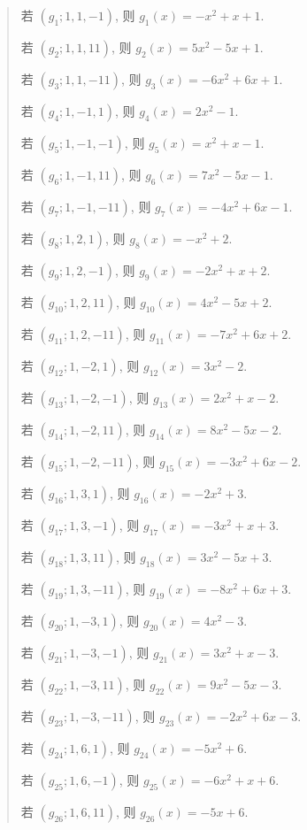 \begin{example}
\begin{quotation}
        若 $(g_1; 1, 1, -1)$, 则 $g_1 (x) = -x^2+x+1$.

        若 $(g_2; 1, 1, 11)$, 则 $g_2 (x) = 5 x^2-5 x+1$.

        若 $(g_3; 1, 1, -11)$, 则 $g_3 (x) = -6 x^2+6 x+1$.

        若 $(g_4; 1, -1, 1)$, 则 $g_4 (x) = 2 x^2-1$.

        若 $(g_5; 1, -1, -1)$, 则 $g_5 (x) = x^2+x-1$.

        若 $(g_6; 1, -1, 11)$, 则 $g_6 (x) = 7 x^2-5 x-1$.

        若 $(g_7; 1, -1, -11)$, 则 $g_7 (x) = -4 x^2+6 x-1$.

        若 $(g_8; 1, 2, 1)$, 则 $g_8 (x) = -x^2+2$.

        若 $(g_9; 1, 2, -1)$, 则 $g_9 (x) = -2 x^2+x+2$.

        若 $(g_{10}; 1, 2, 11)$, 则 $g_{10} (x) = 4 x^2-5 x+2$.

        若 $(g_{11}; 1, 2, -11)$, 则 $g_{11} (x) = -7 x^2+6 x+2$.

        若 $(g_{12}; 1, -2, 1)$, 则 $g_{12} (x) = 3 x^2-2$.

        若 $(g_{13}; 1, -2, -1)$, 则 $g_{13} (x) = 2 x^2+x-2$.

        若 $(g_{14}; 1, -2, 11)$, 则 $g_{14} (x) = 8 x^2-5 x-2$.

        若 $(g_{15}; 1, -2, -11)$, 则 $g_{15} (x) = -3 x^2+6 x-2$.

        若 $(g_{16}; 1, 3, 1)$, 则 $g_{16} (x) = -2 x^2+3$.

        若 $(g_{17}; 1, 3, -1)$, 则 $g_{17} (x) = -3 x^2+x+3$.

        若 $(g_{18}; 1, 3, 11)$, 则 $g_{18} (x) = 3 x^2-5 x+3$.

        若 $(g_{19}; 1, 3, -11)$, 则 $g_{19} (x) = -8 x^2+6 x+3$.

        若 $(g_{20}; 1, -3, 1)$, 则 $g_{20} (x) = 4 x^2-3$.

        若 $(g_{21}; 1, -3, -1)$, 则 $g_{21} (x) = 3 x^2+x-3$.

        若 $(g_{22}; 1, -3, 11)$, 则 $g_{22} (x) = 9 x^2-5 x-3$.

        若 $(g_{23}; 1, -3, -11)$, 则 $g_{23} (x) = -2 x^2+6 x-3$.

        若 $(g_{24}; 1, 6, 1)$, 则 $g_{24} (x) = -5 x^2+6$.

        若 $(g_{25}; 1, 6, -1)$, 则 $g_{25} (x) = -6 x^2+x+6$.

        若 $(g_{26}; 1, 6, 11)$, 则 $g_{26} (x) = -5 x+6$.


\end{quotation}
\end{example}
